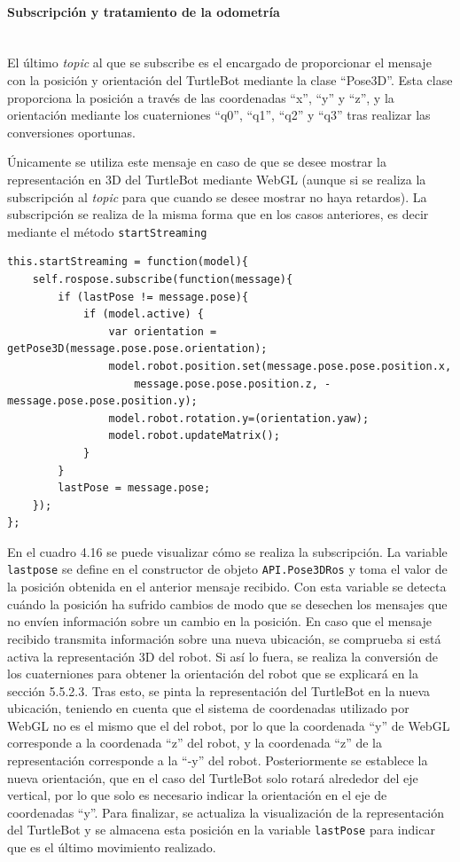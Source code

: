 \paragraph{Subscripción y tratamiento de la odometría}\hspace{0pt}  \\

El último \textit{topic} al que se subscribe es el encargado de proporcionar el mensaje con la posición y orientación del TurtleBot mediante la clase ``Pose3D''. Esta clase proporciona la posición a través de las coordenadas ``x'', ``y'' y ``z'', y la orientación mediante los cuaterniones ``q0'', ``q1'', ``q2'' y ``q3'' tras realizar las conversiones oportunas.

Únicamente se utiliza este mensaje en caso de que se desee mostrar la representación en 3D del TurtleBot mediante WebGL (aunque si se realiza la subscripción al \textit{topic} para que cuando se desee mostrar no haya retardos). La subscripción se realiza de la misma forma que en los casos anteriores, es decir mediante el método \texttt{startStreaming}

\begin{lstlisting}[caption= Subscripción y tratamiento del mensaje para obtener la posición, label=cod.pose3d]
this.startStreaming = function(model){
	self.rospose.subscribe(function(message){
		if (lastPose != message.pose){
			if (model.active) {
				var orientation = getPose3D(message.pose.pose.orientation);
				model.robot.position.set(message.pose.pose.position.x, 
					message.pose.pose.position.z, -message.pose.pose.position.y);
				model.robot.rotation.y=(orientation.yaw);
				model.robot.updateMatrix();
			}
		}
		lastPose = message.pose;
	});
};
\end{lstlisting}

En el cuadro 4.16 se puede visualizar cómo se realiza la subscripción. La variable \texttt{lastpose} se define en el constructor de objeto \texttt{API.Pose3DRos} y toma el valor de la posición obtenida en el anterior mensaje recibido. Con esta variable se detecta cuándo la posición ha sufrido cambios de modo que se desechen los mensajes que no envíen información sobre un cambio en la posición. En caso que el mensaje recibido transmita información sobre una nueva ubicación, se comprueba si está activa la representación 3D del robot. Si así lo fuera, se realiza la conversión de los cuaterniones para obtener la orientación del robot que se explicará en la sección 5.5.2.3. Tras esto, se pinta la representación del TurtleBot en la nueva ubicación, teniendo en cuenta que el sistema de coordenadas utilizado por WebGL no es el mismo que el del robot, por lo que la coordenada ``y'' de WebGL corresponde a la coordenada ``z'' del robot, y la coordenada ``z'' de la representación corresponde a la ``-y'' del robot. Posteriormente se establece la nueva orientación, que en el caso del TurtleBot solo rotará alrededor del eje vertical, por lo que solo es necesario indicar la orientación en el eje de coordenadas ``y''. Para finalizar, se actualiza la visualización de la representación del TurtleBot y se almacena esta posición en la variable \texttt{lastPose} para indicar que es el último movimiento realizado.

